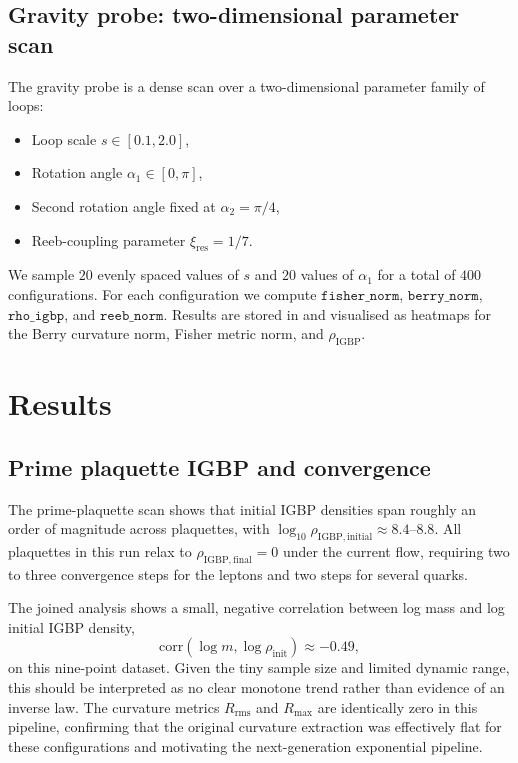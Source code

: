 \documentclass[12pt]{article}
\begin{document}
\subsection{Gravity probe: two-dimensional parameter scan}
The gravity probe is a dense scan over a two-dimensional parameter family of loops:
\begin{itemize}
    \item Loop scale $s \in [0.1, 2.0]$,
    \item Rotation angle $\alpha_1 \in [0, \pi]$,
    \item Second rotation angle fixed at $\alpha_2 = \pi/4$,
    \item Reeb-coupling parameter $\xi_{\mathrm{res}} = 1/7$.
\end{itemize}
We sample $20$ evenly spaced values of $s$ and $20$ values of $\alpha_1$ for a total of $400$ configurations. For each configuration we compute $\texttt{fisher\_norm}$, $\texttt{berry\_norm}$, $\texttt{rho\_igbp}$, and $\texttt{reeb\_norm}$. Results are stored in \cite{gravity-probe-results-20251201} and visualised as heatmaps for the Berry curvature norm, Fisher metric norm, and $\rho_{\mathrm{IGBP}}$.

\section{Results}
\subsection{Prime plaquette IGBP and convergence}
The prime-plaquette scan shows that initial IGBP densities span roughly an order of magnitude across plaquettes, with $\log_{10} \rho_{\mathrm{IGBP, initial}} \approx 8.4$--$8.8$. All plaquettes in this run relax to $\rho_{\mathrm{IGBP, final}} = 0$ under the current flow, requiring two to three convergence steps for the leptons and two steps for several quarks.

The joined analysis \cite{joint-analysis-20251130} shows a small, negative correlation between log mass and log initial IGBP density,
\[
   \mathrm{corr}(\log m, \log \rho_{\mathrm{init}}) \approx -0.49,
\]
on this nine-point dataset. Given the tiny sample size and limited dynamic range, this should be interpreted as no clear monotone trend rather than evidence of an inverse law. The curvature metrics $R_{\mathrm{rms}}$ and $R_{\max}$ are identically zero in this pipeline, confirming that the original curvature extraction was effectively flat for these configurations and motivating the next-generation exponential pipeline.
\end{document}
